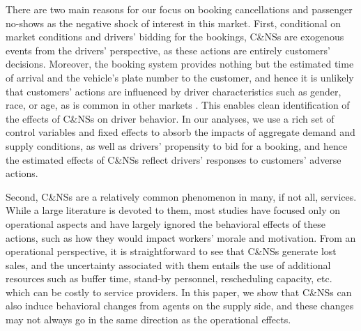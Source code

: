 \documentclass[reviewmode]{AEA}
\begin{document}
There are two main reasons for our focus on booking cancellations and passenger no-shows as the negative shock of interest in this market.
First, conditional on market conditions and drivers' bidding for the bookings, C\&NSs are exogenous events from the drivers' perspective, as  
these actions are entirely 
customers' decisions. Moreover, the booking system provides nothing but 
the estimated time of arrival and the vehicle's plate number to the customer, and hence it is unlikely that customers' actions are influenced by driver characteristics such as gender, race, or age, as is common in other markets \citep{mejia2018transparency,cui2016discrimination,edelman2017racial,NBERw22776}. This enables clean identification of the effects of C\&NSs on driver behavior. In our analyses, we use a rich set of control variables and fixed effects to absorb the impacts of aggregate demand and supply conditions, as well as drivers' propensity to bid for a booking, and hence the estimated effects of C\&NSs reflect drivers' responses to customers' adverse actions.

Second,  C\&NSs are a relatively common phenomenon in many, if not all, services. While a large literature is devoted to them,  most studies \citep{moore2001time,liu2010dynamic,feldman2014appointment,zacharias2014appointment} have focused only on operational aspects and have largely ignored the behavioral effects of these actions, such as how they would impact workers' morale and motivation.
From an operational perspective, it is straightforward to see that C\&NSs generate lost sales, and the uncertainty associated with them entails the use of additional resources such as buffer time, stand-by personnel, rescheduling capacity, etc. which can be costly to service providers.
In this paper, we show that C\&NSs can also induce behavioral changes from agents on the supply side, and these changes may not always go in the same direction as the operational effects.
\end{document}
